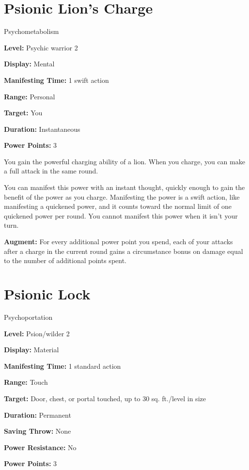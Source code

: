 \documentclass{article}
\begin{document}
\vspace{12pt}
\section*{Psionic Lion's Charge}

Psychometabolism

\textbf{Level:} Psychic warrior 2

\textbf{Display:} Mental

\textbf{Manifesting Time:} 1 swift action

\textbf{Range:} Personal

\textbf{Target:} You

\textbf{Duration:} Instantaneous

\textbf{Power Points:} 3

You gain the powerful charging ability of a lion. When you charge, you can make 
a full attack in the same round.

You can manifest this power with an instant thought, quickly enough to gain the 
benefit of the power as you charge. Manifesting the power is a swift action, like 
manifesting a quickened power, and it counts toward the normal limit of one quickened 
power per round. You cannot manifest this power when it isn't your turn.

\textbf{Augment:} For every additional power point you spend, each of your attacks 
after a charge in the current round gains a circumstance bonus on damage equal 
to the number of additional points spent.

\vspace{12pt}
\section*{Psionic Lock}

Psychoportation

\textbf{Level:} Psion/wilder 2

\textbf{Display:} Material

\textbf{Manifesting Time:} 1 standard action

\textbf{Range:} Touch

\textbf{Target:} Door, chest, or portal touched, up to 30 sq. ft./level in size

\textbf{Duration:} Permanent

\textbf{Saving Throw:} None

\textbf{Power Resistance:} No

\textbf{Power Points:} 3
\end{document}
